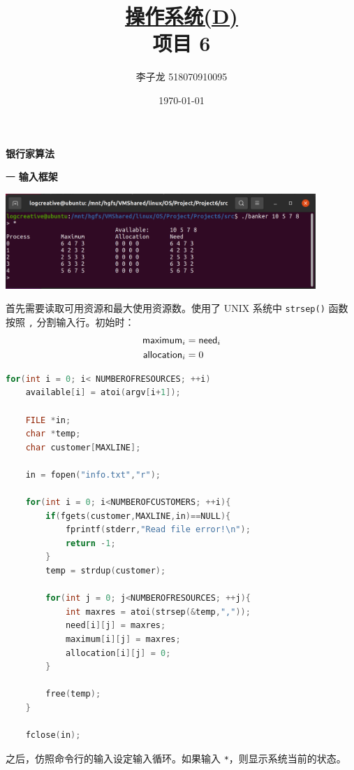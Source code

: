 \documentclass[12pt,a4paper]{article}
\newenvironment{problems}{\begin{list}{}{\renewcommand{\makelabel}[1]{\textbf{##1}\hfil}}}{\end{list}}
\begin{document}
\title{\normalsize \underline{操作系统(D)}\\\LARGE 项目 6}
\author{李子龙 518070910095}
\date{\today}
\maketitle

\textbf{银行家算法}
\begin{problems}
    \item[一] \textbf{输入框架}
    
    \includegraphics[width=0.88\textwidth]{input.png}

    首先需要读取可用资源和最大使用资源数。使用了 UNIX 系统中 \verb"strsep()" 函数按照 \verb"," 分割输入行。初始时：
    \begin{align*}
        \text{\sffamily maximum}_i &= \text{\sffamily need}_i \\
        \text{\sffamily allocation}_i &=0
    \end{align*}
    \begin{lstlisting}[language=c]
    for(int i = 0; i< NUMBEROFRESOURCES; ++i)
    available[i] = atoi(argv[i+1]);
    
    FILE *in;
    char *temp;
    char customer[MAXLINE];

    in = fopen("info.txt","r");

    for(int i = 0; i<NUMBEROFCUSTOMERS; ++i){
        if(fgets(customer,MAXLINE,in)==NULL){
            fprintf(stderr,"Read file error!\n");
            return -1;
        }
        temp = strdup(customer);

        for(int j = 0; j<NUMBEROFRESOURCES; ++j){
            int maxres = atoi(strsep(&temp,","));
            need[i][j] = maxres;
            maximum[i][j] = maxres;
            allocation[i][j] = 0;
        }
        
        free(temp);
    }

    fclose(in);
    \end{lstlisting}

    之后，仿照命令行的输入设定输入循环。如果输入 \verb"*"，则显示系统当前的状态。


\end{problems}
\end{document}
